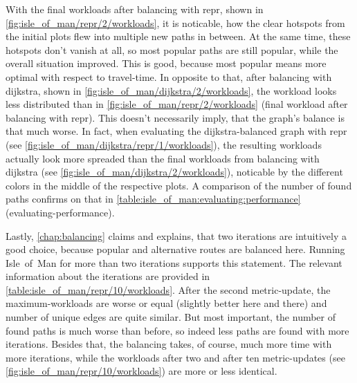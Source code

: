         With the final workloads after \gls{balancing} with \gls{repr}, shown in \vref{fig:isle_of_man/repr/2/workloads}, it is noticable, how the clear hotspots from the initial plots flew into multiple new paths in between.
        At the same time, these hotspots don't vanish at all, so most popular paths are still popular, while the overall situation improved.
        This is good, because most popular means more optimal with respect to travel-time.
        In opposite to that, after \gls{balancing} with \gls{dijkstra}, shown in \cref{fig:isle_of_man/dijkstra/2/workloads}, the workload looks less distributed than in \cref{fig:isle_of_man/repr/2/workloads} (final workload after \gls{balancing} with \gls{repr}).
        This doesn't necessarily imply, that the graph's balance is that much worse.
        In fact, when evaluating the \gls{dijkstra}-balanced graph with \gls{repr} (see \vref{fig:isle_of_man/dijkstra/repr/1/workloads}), the resulting workloads actually look more spreaded than the final workloads from \gls{balancing} with \gls{dijkstra} (see \cref{fig:isle_of_man/dijkstra/2/workloads}), noticable by the different colors in the middle of the respective plots.
        A comparison of the number of found paths confirms on that in \vref{table:isle_of_man:evaluating:performance} (evaluating-performance).

        Lastly, \cref{chap:balancing} claims and explains, that two iterations are intuitively a good choice, because popular and alternative routes are balanced here.
        Running Isle~of~Man for more than two iterations supports this statement.
        The relevant information about the iterations are provided in \vref{table:isle_of_man/repr/10/workloads}.
        After the second \gls{metric}-update, the maximum-workloads are worse or equal (slightly better here and there) and number of unique edges are quite similar.
        But most important, the number of found paths is much worse than before, so indeed less paths are found with more iterations.
        Besides that, the \gls{balancing} takes, of course, much more time with more iterations, while the workloads after two and after ten \gls{metric}-updates (see \vref{fig:isle_of_man/repr/10/workloads}) are more or less identical.

